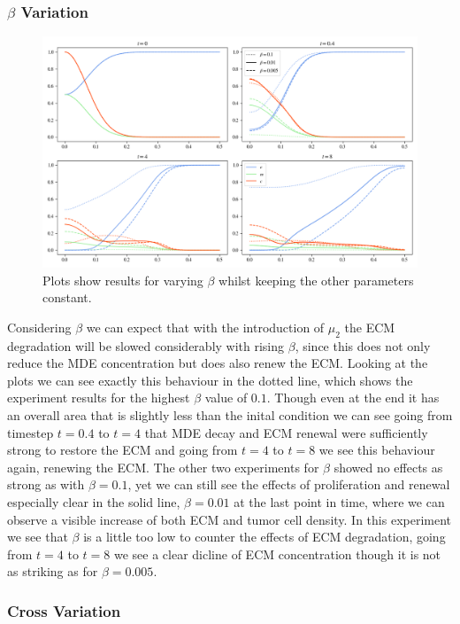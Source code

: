 \subsubsection*{$\beta$ Variation}
\begin{figure}[h]
    \centering
    \includegraphics[width=\textwidth]{resources/images/prolif_beta_variation.png}
    \caption{Plots show results for varying $\beta$ whilst keeping the other parameters constant.}
    \label{fig:prolif_beta_variation}
\end{figure}

Considering $\beta$ we can expect that with the introduction of $\mu_2$ the ECM degradation will be slowed considerably with rising $\beta$, since this does not only reduce the MDE concentration but does also renew the ECM. Looking at the plots we can see exactly this behaviour in the dotted line, which shows the experiment results for the highest $\beta$ value of $0.1$. Though even at the end it has an overall area that is slightly less than the inital condition we can see going from timestep $t=0.4$ to $t=4$ that MDE decay and ECM renewal were sufficiently strong to restore the ECM and going from $t=4$ to $t=8$ we see this behaviour again, renewing the ECM. The other two experiments for $\beta$ showed no effects as strong as with $\beta=0.1$, yet we can still see the effects of proliferation and renewal especially clear in the solid line, $\beta=0.01$ at the last point in time, where we can observe a visible increase of both ECM and tumor cell density. In this experiment we see that $\beta$ is a little too low to counter the effects of ECM degradation, going from $t=4$ to $t=8$ we see a clear dicline of ECM concentration though it is not as striking as for $\beta=0.005$. 

\subsubsection*{Cross Variation}

